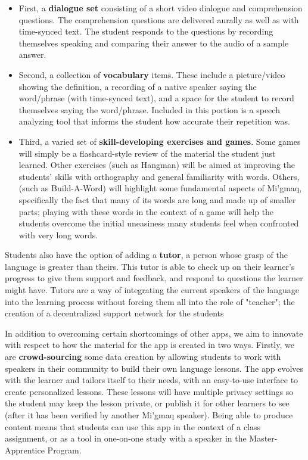 \documentclass[12pt]{article} %
\begin{document}
\begin{itemize} 
\item First, a {\bf dialogue set} consisting of a short video dialogue and comprehension questions. The comprehension questions are delivered aurally as well as with time-synced text. The student responds to the questions by recording themselves speaking and comparing their answer to the audio of a sample answer. 
\item Second, a collection of {\bf vocabulary} items. These include a picture/video showing the definition, a recording of a native speaker saying the word/phrase (with time-synced text), and a space for the student to record themselves saying the word/phrase. Included in this portion is a speech analyzing tool that informs the student how accurate their repetition was.
\item Third, a varied set of {\bf skill-developing exercises and games}. Some games will simply be a flashcard-style review of the material the student just learned. Other exercises (such as Hangman) will be aimed at improving the students' skills with orthography and general familiarity with words. Others, (such as Build-A-Word) will highlight some fundamental aspects of Mi'gmaq, specifically the fact that many of its words are long and made up of smaller parts; playing with these words in the context of a game will help the students overcome the initial uneasiness many students feel when confronted with very long words.
\end{itemize}

Students also have the option of adding a {\bf tutor}, a person whose grasp of the language is greater than theirs. This tutor is able to check up on their learner's progress to give them support and feedback, and respond to questions the learner might have. Tutors are a way of integrating the current speakers of the language into the learning process without forcing them all into the role of "teacher"; the creation of a decentralized support network for the students 

In addition to overcoming certain shortcomings of other apps, we aim to innovate with respect to how the material for the app is created in two ways. Firstly, we are {\bf crowd-sourcing} some data creation by allowing students to work with speakers in their community to build their own language lessons. The app evolves with the learner and tailors itself to their needs, with an easy-to-use interface to create personalized lessons. These lessons will have multiple privacy settings so the student may keep the lesson private, or publish it for other learners to see (after it has been verified by another Mi'gmaq speaker). Being able to produce content means that students can use this app in the context of a class assignment, or as a tool in one-on-one study with a speaker in the Master-Apprentice Program.
\end{document}

